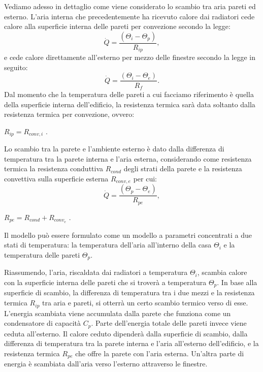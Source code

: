 \documentclass[laurea,oneside,11pt]{USiena_tesiLM3}
\begin{document}
Vediamo adesso in dettaglio come viene considerato lo scambio tra aria pareti ed esterno. L'aria interna che precedentemente ha ricevuto calore dai radiatori cede calore alla superficie interna delle pareti per convezione secondo la legge:
\begin{equation}
\dot{Q} = \frac{(\Theta_i - \Theta_p)}{R_{ip}} ,
\end{equation} 
e cede calore direttamente all'esterno per mezzo delle finestre secondo la legge in seguito:
\begin{equation}
\dot{Q} = \frac{(\Theta_i - \Theta_e)}{R_{f}} .
\end{equation} 
Dal momento che la temperatura delle pareti a cui facciamo riferimento è quella della superficie interna dell'edificio, la resistenza termica sarà data soltanto dalla resistenza termica per convezione, ovvero:
\begin{center}
$R_{ip} = R_{conv,i}$ .
\end{center}

Lo scambio tra la parete e l'ambiente esterno è dato dalla differenza di temperatura tra la parete interna e l'aria  esterna, considerando come resistenza termica la resistenza conduttiva $R_{cond}$ degli strati della parete e la resistenza convettiva sulla superficie esterna $R_{conv,e}$ per cui:
\begin{equation}
\dot{Q} = \frac{(\Theta_p - \Theta_e)}{R_{pe}}  ,
\end{equation} 
\begin{center}
$R_{pe} = R_{cond} + R_{conv_e}$ .
\end{center}

Il modello può essere formulato come un modello a parametri concentrati a due stati di temperatura: la temperatura dell'aria all'interno della casa $\Theta_i$ e la temperatura delle pareti $\Theta_p$.

Riassumendo, l'aria, riscaldata dai radiatori a temperatura $\Theta_i$, scambia calore con la superficie interna delle pareti che si troverà a temperatura $\Theta_p$. In base alla superficie di scambio, la differenza di temperatura tra i due mezzi e la resistenza termica $R_{ip}$ tra aria e pareti, si otterrà un certo scambio termico verso di esse. L'energia scambiata viene accumulata dalla parete che funziona come un condensatore di capacità $C_p$. Parte dell'energia totale delle pareti invece viene ceduta all'esterno. Il calore ceduto dipenderà dalla superficie di scambio, dalla differenza di temperatura tra la parete interna e l'aria all'esterno dell'edificio, e la resistenza termica $R_{pe}$ che offre la parete con l'aria esterna. Un'altra parte di energia è scambiata dall'aria verso l'esterno attraverso le finestre.  
\end{document}
